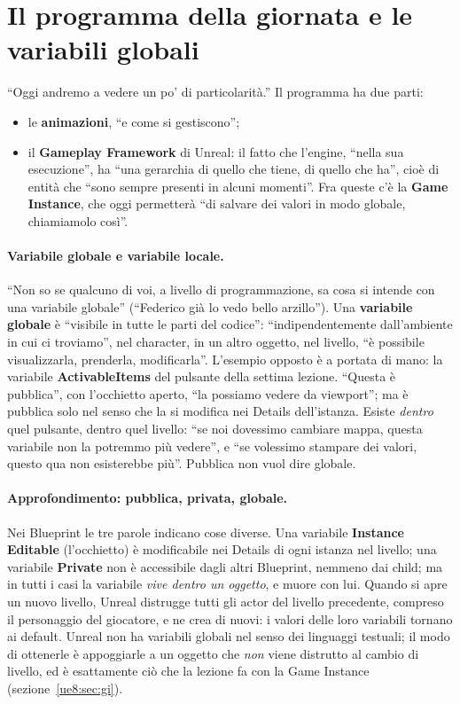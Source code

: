 \section{Il programma della giornata e le variabili globali}
\label{ue8:sec:programma}

``Oggi andremo a vedere un po' di particolarità.'' Il programma ha due parti:
\begin{itemize}
  \item le \textbf{animazioni}, ``e come si gestiscono'';
  \item il \textbf{Gameplay Framework} di Unreal: il fatto che l'engine, ``nella sua
        esecuzione'', ha ``una gerarchia di quello che tiene, di quello che ha'', cioè
        di entità che ``sono sempre presenti in alcuni momenti''. Fra queste c'è la
        \textbf{Game Instance}, che oggi permetterà ``di salvare dei valori in modo
        globale, chiamiamolo così''.
\end{itemize}

\paragraph{Variabile globale e variabile locale.} ``Non so se qualcuno di voi, a livello
di programmazione, sa cosa si intende con una variabile globale'' (``Federico già lo vedo
bello arzillo''). Una \textbf{variabile globale} è ``visibile in tutte le parti del
codice'': ``indipendentemente dall'ambiente in cui ci troviamo'', nel character, in un
altro oggetto, nel livello, ``è possibile visualizzarla, prenderla, modificarla''.
L'esempio opposto è a portata di mano: la variabile \textbf{ActivableItems} del pulsante
della settima lezione. ``Questa è pubblica'', con l'occhietto aperto, ``la possiamo
vedere da viewport''; ma è pubblica solo nel senso che la si modifica nei Details
dell'istanza. Esiste \emph{dentro} quel pulsante, dentro quel livello: ``se noi dovessimo
cambiare mappa, questa variabile non la potremmo più vedere'', e ``se volessimo stampare
dei valori, questo qua non esisterebbe più''. Pubblica non vuol dire globale.

\paragraph{Approfondimento: pubblica, privata, globale.} Nei Blueprint le tre parole
indicano cose diverse. Una variabile \textbf{Instance Editable} (l'occhietto) è
modificabile nei Details di ogni istanza nel livello; una variabile \textbf{Private} non
è accessibile dagli altri Blueprint, nemmeno dai child; ma in tutti i casi la variabile
\emph{vive dentro un oggetto}, e muore con lui. Quando si apre un nuovo livello, Unreal
distrugge tutti gli actor del livello precedente, compreso il personaggio del giocatore,
e ne crea di nuovi: i valori delle loro variabili tornano ai default. Unreal non ha
variabili globali nel senso dei linguaggi testuali; il modo di ottenerle è appoggiarle a
un oggetto che \emph{non} viene distrutto al cambio di livello, ed è esattamente ciò che
la lezione fa con la Game Instance (sezione~\ref{ue8:sec:gi}).

